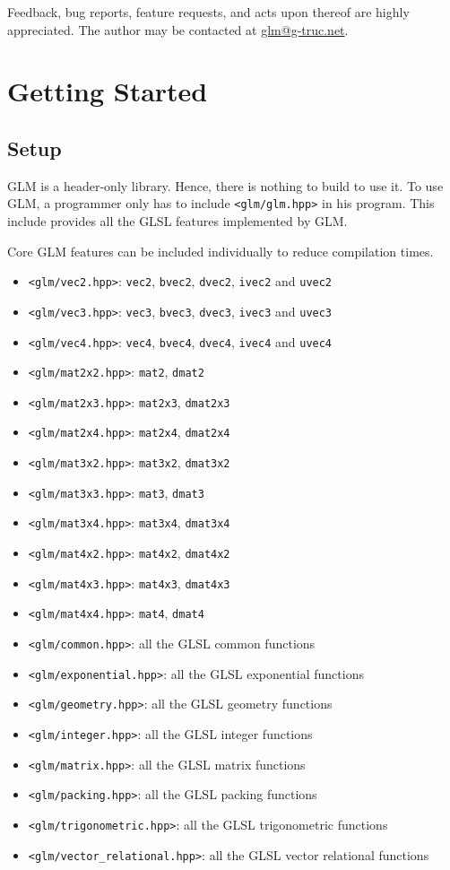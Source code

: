\documentclass{scrartcl}
\numberwithin{figure}{subsection}
\begin{document}
Feedback, bug reports, feature requests, and acts upon thereof are highly appreciated.  The author may be contacted at \href{mailto://glm@g-truc.net}{glm@g-truc.net}.


\section{Getting Started}
\subsection{Setup}
GLM is a header-only library. Hence, there is nothing to build to use it. To use GLM, a programmer only has to include \verb|<glm/glm.hpp>| in his program. This include provides all the GLSL features implemented by GLM.

Core GLM features can be included individually to reduce compilation times.

\begin{itemize}
\item \verb|<glm/vec2.hpp>|: \verb|vec2|, \verb|bvec2|, \verb|dvec2|, \verb|ivec2| and \verb|uvec2|
\item \verb|<glm/vec3.hpp>|: \verb|vec3|, \verb|bvec3|, \verb|dvec3|, \verb|ivec3| and \verb|uvec3|
\item \verb|<glm/vec4.hpp>|: \verb|vec4|, \verb|bvec4|, \verb|dvec4|, \verb|ivec4| and \verb|uvec4|
\item \verb|<glm/mat2x2.hpp>|: \verb|mat2|, \verb|dmat2|
\item \verb|<glm/mat2x3.hpp>|: \verb|mat2x3|, \verb|dmat2x3|
\item \verb|<glm/mat2x4.hpp>|: \verb|mat2x4|, \verb|dmat2x4|
\item \verb|<glm/mat3x2.hpp>|: \verb|mat3x2|, \verb|dmat3x2|
\item \verb|<glm/mat3x3.hpp>|: \verb|mat3|, \verb|dmat3|
\item \verb|<glm/mat3x4.hpp>|: \verb|mat3x4|, \verb|dmat3x4|
\item \verb|<glm/mat4x2.hpp>|: \verb|mat4x2|, \verb|dmat4x2|
\item \verb|<glm/mat4x3.hpp>|: \verb|mat4x3|, \verb|dmat4x3|
\item \verb|<glm/mat4x4.hpp>|: \verb|mat4|, \verb|dmat4|
\item \verb|<glm/common.hpp>|: all the GLSL common functions
\item \verb|<glm/exponential.hpp>|: all the GLSL exponential functions
\item \verb|<glm/geometry.hpp>|: all the GLSL geometry functions
\item \verb|<glm/integer.hpp>|: all the GLSL integer functions
\item \verb|<glm/matrix.hpp>|: all the GLSL matrix functions
\item \verb|<glm/packing.hpp>|: all the GLSL packing functions
\item \verb|<glm/trigonometric.hpp>|: all the GLSL trigonometric functions
\item \verb|<glm/vector_relational.hpp>|: all the GLSL vector relational functions
\end{itemize}
\end{document}
